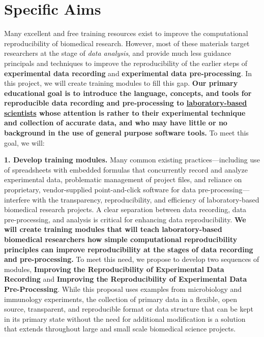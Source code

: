 \documentclass[pdftex,english,11.5pt,parskip=half]{scrartcl}
\begin{document}
\def\bf{\normalfont\bfseries}
\pagestyle{empty}

\section*{Specific Aims}
\begingroup
    \fontsize{11pt}{12pt}\selectfont 
    
Many excellent and free training resources exist to improve the computational reproducibility of biomedical research. However, most of these materials target researchers at the stage of \textit{data analysis}, and provide much less guidance principals and techniques to improve the reproducibility of the earlier steps of \textbf{experimental data recording} and \textbf{experimental data pre-processing}. In this project, we will create training modules to fill this gap. \textbf{Our primary educational goal is to introduce the language, concepts, and tools for reproducible data recording and pre-processing to \underline{laboratory-based scientists} whose attention is rather to 
their experimental technique and collection of accurate data, and who may have little or no background 
in the use of general purpose software tools.} To meet this goal, we will:

\textbf{1. Develop training modules.} Many common existing practices---including use of
spreadsheets with embedded formulas that concurrently record and analyze
experimental data, problematic management of project files,
and reliance on proprietary, vendor-supplied point-and-click software for data
pre-processing---interfere with the transparency, reproducibility, and
efficiency of laboratory-based biomedical research projects. A clear separation between data recording, data pre-processing, and
analysis is critical for enhancing data reproducibility. \textbf{We will create training modules that will teach laboratory-based biomedical
researchers how simple computational reproducibility principles can improve
reproducibility at the stages of data recording and
pre-processing.} To meet this need, we propose to develop two sequences of modules, \textbf{Improving the
Reproducibility of Experimental Data Recording} and \textbf{Improving the
Reproducibility of Experimental Data Pre-Processing}. 
While this proposal uses examples from microbiology 
and immunology experiments, the collection of primary data in a flexible, open source, 
transparent, and reproducible format or data structure that can be kept in its primary state 
without the need for additional modification is a solution that extends throughout large and 
small scale biomedical science projects.
\end{document}
